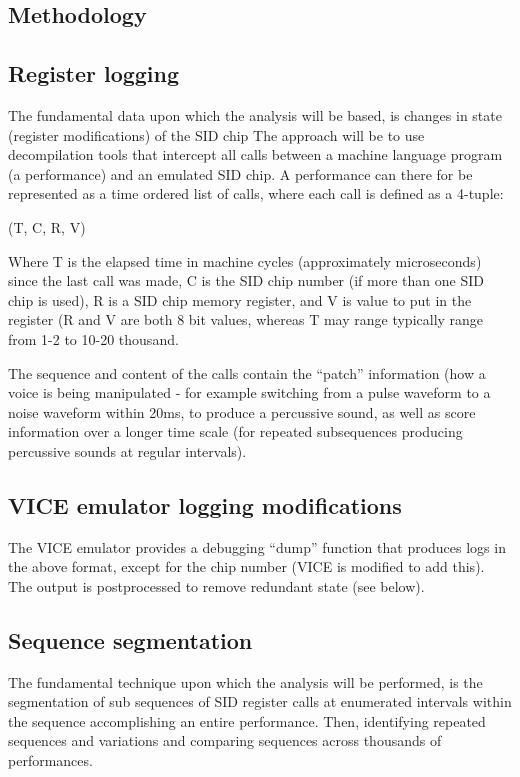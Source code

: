 \documentclass[10pt]{article}
\begin{document}
\begin{multicols*}{2}
  \section{Methodology}

  \subsection{Register logging}
  The fundamental data upon which the analysis will be based, is
  changes in state (register modifications) of the SID chip The
  approach will be to use decompilation tools that intercept all calls
  between a machine language program (a performance) and an emulated
  SID chip. A performance can there for be represented as a time ordered
  list of calls, where each call is defined as a 4-tuple:

  (T, C, R, V)

  Where T is the elapsed time in machine cycles (approximately
  microseconds) since the last call was made, C is the SID chip number
  (if more than one SID chip is used), R is a SID chip memory
  register, and V is value to put in the register (R and V are both 8
  bit values, whereas T may range typically range from 1-2 to 10-20
  thousand.

  The sequence and content of the calls contain the ``patch''
  information (how a voice is being manipulated - for example
  switching from a pulse waveform to a noise waveform within 20ms, to
  produce a percussive sound, as well as score information over a
  longer time scale (for repeated subsequences producing percussive
  sounds at regular intervals).

  \subsection{VICE emulator logging modifications}
  The VICE emulator provides a debugging ``dump'' function that
  produces logs in the above format, except for the chip number
  (VICE is modified to add this).  The output is postprocessed
  to remove redundant state (see below).

  \subsection{Sequence segmentation}
  The fundamental technique upon which the analysis will be performed,
  is the segmentation of sub sequences of SID register calls at
  enumerated intervals within the sequence accomplishing an entire
  performance. Then, identifying repeated sequences and variations and
  comparing sequences across thousands of performances.


\end{multicols*}
\end{document}

